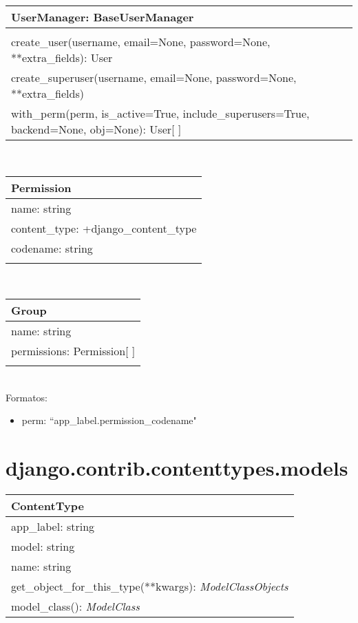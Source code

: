 \begin{tabular}{|l|}
	\hline
	\textbf{UserManager: BaseUserManager} \\
	\hline
	\\
	\hline
	create\_user(username, email=None, password=None, **extra\_fields): User \\
	create\_superuser(username, email=None, password=None, **extra\_fields) \\
	with\_perm(perm, is\_active=True, include\_superusers=True, backend=None, obj=None): User[ ] \\
	\hline
\end{tabular}\\

\begin{tabular}{|l|}
	\hline
	\textbf{Permission} \\
	\hline
	name: string \\
	content\_type: +django\_content\_type \\
	codename: string \\
	\hline
	\\
	\hline
\end{tabular}\\

\begin{tabular}{|l|}
	\hline
	\textbf{Group} \\
	\hline
	name: string \\
	permissions:  Permission[ ] \\
	\hline
	\\
	\hline
\end{tabular}\\

Formatos:

\begin{itemize}
	\item perm: ``app\_label.permission\_codename"
\end{itemize}

\section{django.contrib.contenttypes.models}

\begin{tabular}{|l|}
	\hline
	\textbf{ContentType} \\
	\hline
	app\_label: string \\
	model: string \\
	name: string \\
	\hline
	get\_object\_for\_this\_type(**kwargs): \textit{ModelClassObjects} \\
	model\_class(): \textit{ModelClass} \\
	\hline
\end{tabular}\\

